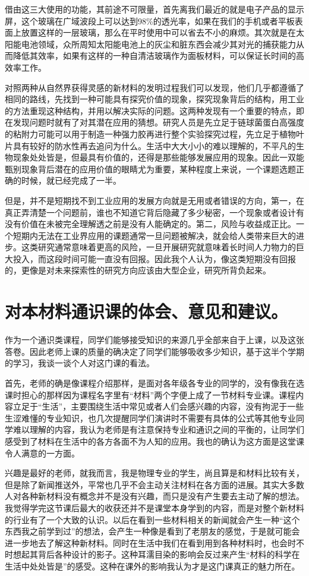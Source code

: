 \documentclass[UTF8,9pt]{ctexart}
\newcommand\se{\section}                                               %
\begin{document}
借由这三大使用的功能，其前途不可限量，首先离我们最近的就是电子产品的显示屏，这个玻璃在广域波段上可以达到98\%的透光率，如果在我们的手机或者平板表面上放置这样的一层玻璃，那么在平时使用中可以省去不小的麻烦。其次就是在太阳能电池领域，众所周知太阳能电池上的灰尘和脏东西会减少其对光的捕获能力从而降低其效率，如果有这样的一种自清洁玻璃作为面板材料，可以保证长时间的高效率工作。

对照两种从自然界获得灵感的新材料的发明过程我们可以发现，他们几乎都遵循了相同的路线，先找到一种可能具有探究价值的现象，探究现象背后的结构，用工业的方法重现这种结构，并用以解决实际的问题。这两种发现有一个重要的特点，即在发现问题时就有了对其潜在应用的猜想。研究人员是先立足于链球菌蛋白高强度的粘附力可能可以用于制造一种强力胶再进行整个实验探究过程，先立足于植物叶片具有较好的防水性再去追问为什么。生活中大大小小的难以理解的，不平凡的生物现象处处皆是，但最具有价值的，还得是那些能够发展应用的现象。因此一双能甄别现象背后潜在的应用价值的眼睛尤为重要，某种程度上来说，一个课题选题正确的时候，就已经完成了一半。

但是，并不是短期找不到工业应用的发展方向就是无用或者错误的方向，第一，在真正弄清楚一个问题前，谁也不知道它背后隐藏了多少秘密，一个现象或者设计有没有价值在未被完全理解透之前是没有人能确定的。第二，风险与收益成正比。一个短期内无法在工业界应用的课题通常一旦问题被解决，就会给人类带来巨大的进步。这类研究通常意味着更高的风险，一旦开展研究就意味着长时间人力物力的巨大投入，而这段时间可能一直没有回报。因此我个人认为，像这类短期没有回报的，更像是对未来探索性的研究方向应该由大型企业，研究所背负起来。
\se{对本材料通识课的体会、意见和建议。}
作为一个通识类课程，同学们能够接受知识的来源几乎全部来自于上课，以及这张答卷。因此老师上课的质量的确决定了同学们能够吸收多少知识，基于这半个学期的学习，我谈一谈个人对这门课的看法。

首先，老师的确是像课程介绍那样，是面对各年级各专业的同学的，没有像我在选课时担心的那样因为课程名字里有``材料''两个字便上成了一节材料专业课。课程内容立足于``生活''，主要围绕生活中常见或者人们会感兴趣的内容，没有拘泥于一些生涩难懂的专业知识，也几次提醒同学们演讲时不需要有具体的公式等其他专业同学难以理解的内容，我认为老师是有注意保持专业和通识之间的平衡的，让同学们感受到了材料在生活中的各方各面不为人知的应用。我也的确认为这方面是这堂课令人满意的一方面。

兴趣是最好的老师，就我而言，我是物理专业的学生，尚且算是和材料比较有关，但是除了新闻推送外，平常也几乎不会主动关注材料在各方面的进展。其实大多数人对各种新材料没有概念并不是没有兴趣，而只是没有产生要去主动了解的想法。我觉得学完这节课后最大的收获还并不是课堂本身学到的内容，而是对整个新材料的行业有了一个大致的认识。以后在看到一些材料相关的新闻就会产生一种``这个东西我之前学到过''的想法，会产生一种像是看到了老朋友的感觉，于是就可能会进一步地去了解这种新材料。同时在生活中我们在看到用到各种材料时，也会时不时想起其背后各种设计的影子。这种耳濡目染的影响会反过来产生``材料的科学在生活中处处皆是''的感受。这种在课外的影响我认为才是这门课真正的魅力所在。
\end{document}
